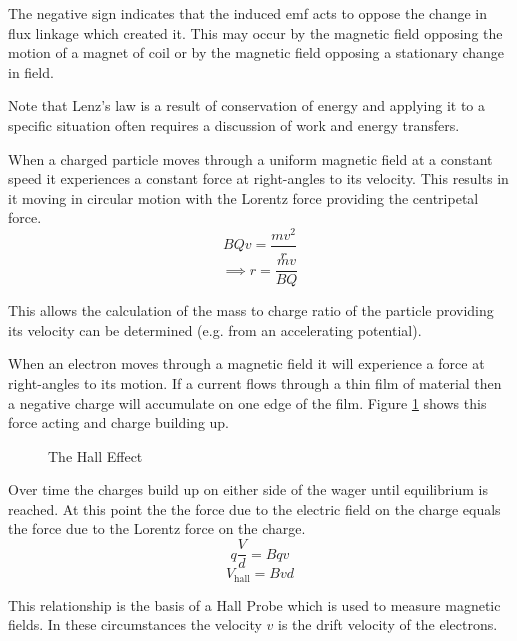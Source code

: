\documentclass[revision-guide.tex]{subfiles}
\begin{document}
 The negative sign indicates that the induced emf acts to oppose the change in flux linkage which created it. This may occur by the magnetic field opposing the motion of a magnet of coil or by the magnetic field opposing a stationary change in field.
 
 Note that Lenz's law is a result of conservation of energy and applying it to a specific situation often requires a discussion of work and energy transfers.


When a charged particle moves through a uniform magnetic field at a constant speed it experiences a constant force at right-angles to its velocity. This results in it moving in circular motion with the Lorentz force providing the centripetal force.
\[ BQv = \frac{mv^2}{r} \]
\[\implies r = \frac{mv}{BQ} \]

This allows the calculation of the mass to charge ratio of the particle providing its velocity can be determined (e.g. from an accelerating potential).

\newpage
{}

When an electron moves through a magnetic field it will experience a force at right-angles to its motion. If a current flows through a thin film of material then a negative charge will accumulate on one edge of the film. Figure \ref{halleffect} shows this force acting and charge building up.

\begin{figure}[h]
  \begin{center}
  \end{center}
  \caption{The Hall Effect}
  \label{halleffect}
\end{figure}

Over time the charges build up on either side of the wager until equilibrium is reached. At this point the the force due to the electric field on the charge equals the force due to the Lorentz force on the charge.
$$ q\frac{V}{d} = Bqv $$
$$ V_\text{hall} = Bvd $$

This relationship is the basis of a Hall Probe which is used to measure magnetic fields. In these circumstances the velocity $v$ is the drift velocity of the electrons.
\end{document}
